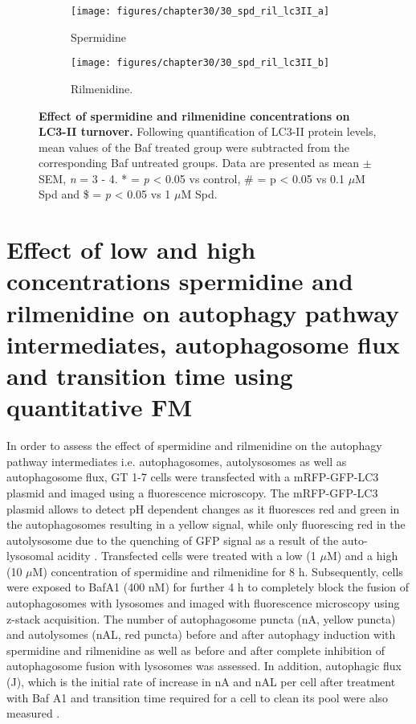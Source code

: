 {\begin{figure}[!htbp]
  \centering
  \begin{subfigure}[b]{0.495\linewidth}
    \texttt{[image: figures/chapter30/30\_spd\_ril\_lc3II\_a]}
    \caption{Spermidine}
  \end{subfigure}
  \begin{subfigure}[b]{0.495\linewidth}
    \texttt{[image: figures/chapter30/30\_spd\_ril\_lc3II\_b]}
    \caption{Rilmenidine.}
  \end{subfigure}
  \caption[Effect of spermidine and rilmenidine concentrations on LC3-II turnover]{\textbf{Effect of spermidine and rilmenidine concentrations on LC3-II turnover.} Following quantification of LC3-II protein levels, mean values of the Baf treated group were subtracted from the corresponding Baf untreated groups. Data are presented as mean $\pm$ SEM, \textit{n} = 3 - 4. * = \textit{p} < 0.05 vs control, \# = p < 0.05 vs 0.1 $\mu$M Spd and \$ = \textit{p} < 0.05 vs 1 $\mu$M Spd.}
  \label{fig:30_spd_ril_lc3ii}
\end{figure}

\section{Effect of low and high concentrations spermidine and rilmenidine on autophagy pathway intermediates, autophagosome flux and transition time using quantitative FM}
In order to assess the effect of spermidine and rilmenidine on the autophagy pathway intermediates i.e. autophagosomes, autolysosomes as well as autophagosome flux, GT 1-7 cells were transfected with a mRFP-GFP-LC3 plasmid \citep{yoshii2017} and imaged using a fluorescence microscopy. The mRFP-GFP-LC3 plasmid allows to detect pH dependent changes as it fluoresces red and green in the autophagosomes resulting in a yellow signal, while only fluorescing red in the autolysosome due to the quenching of GFP signal as a result of the auto-lysosomal acidity \citep{yoshii2017}. Transfected cells were treated with a low (1 $\mu$M) and a high (10 $\mu$M) concentration of spermidine and rilmenidine for 8 h. Subsequently, cells were exposed to BafA1 (400 nM) for further 4 h to completely block the fusion of autophagosomes with lysosomes \citep{DuToit2018b} and imaged with fluorescence microscopy using z-stack acquisition. The number of autophagosome puncta (nA, yellow puncta) and autolysomes (nAL, red puncta) before and after autophagy induction with spermidine and rilmenidine as well as before and after complete inhibition of autophagosome fusion with lysosomes was assessed. In addition, autophagic flux (J), which is the initial rate of increase in nA and nAL per cell after treatment with Baf A1 and transition time required for a cell to clean its pool were also measured \citep{DuToit2018a,DuToit2018b,loos2014}.

}
